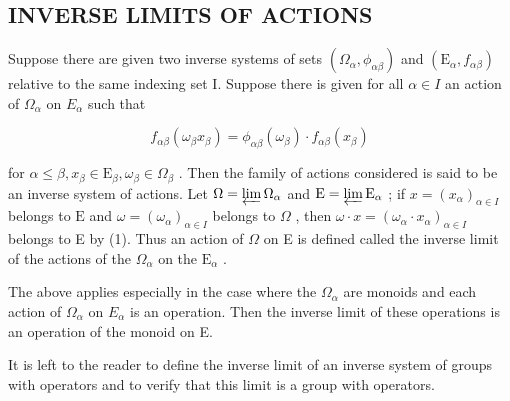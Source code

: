 \subsection{INVERSE LIMITS OF ACTIONS}

Suppose there are given two inverse systems of sets \((\Omega_{\alpha}, \phi_{\alpha\beta})\) and \((\mathrm{E}_{\alpha}, f_{\alpha\beta})\) relative to the same indexing set I. Suppose there is given for all \(\alpha \in I\) an action of \(\Omega_{\alpha}\) on \(E_{\alpha}\) such that

\[
f _ {\alpha \beta} (\omega_ {\beta} x _ {\beta}) = \phi_ {\alpha \beta} (\omega_ {\beta}) \cdot f _ {\alpha \beta} (x _ {\beta})\tag{1}
\]

for \(\alpha \leqslant \beta, x_{\beta} \in \mathrm{E}_{\beta}, \omega_{\beta} \in \Omega_{\beta}\) . Then the family of actions considered is said to be an inverse system of actions. Let \(\Omega = \varprojlim \Omega_{\alpha}\) and \(\mathrm{E} = \varprojlim \mathrm{E}_{\alpha}\) ; if \(x = (x_{\alpha})_{\alpha \in I}\) belongs to \(\mathrm{E}\) and \(\omega = (\omega_{\alpha})_{\alpha \in I}\) belongs to \(\Omega\) , then \(\omega \cdot x = (\omega_{\alpha} \cdot x_{\alpha})_{\alpha \in I}\) belongs to E by (1). Thus an action of \(\Omega\) on E is defined called the inverse limit of the actions of the \(\Omega_{\alpha}\) on the \(\mathrm{E}_{\alpha}\) .

The above applies especially in the case where the \(\Omega_{\alpha}\) are monoids and each action of \(\Omega_{\alpha}\) on \(E_{\alpha}\) is an operation. Then the inverse limit of these operations is an operation of the monoid on E.

It is left to the reader to define the inverse limit of an inverse system of groups with operators and to verify that this limit is a group with operators.


